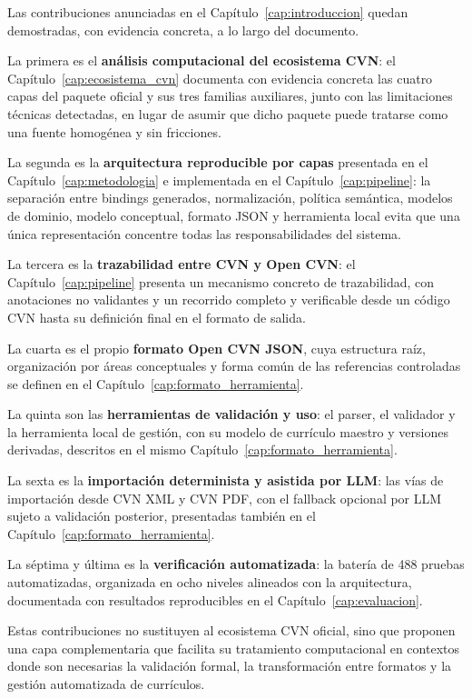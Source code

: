 Las contribuciones anunciadas en el Capítulo~\ref{cap:introduccion} quedan
demostradas, con evidencia concreta, a lo largo del documento.

La primera es el \textbf{análisis computacional del ecosistema CVN}: el
Capítulo~\ref{cap:ecosistema_cvn} documenta con evidencia concreta las
cuatro capas del paquete oficial y sus tres familias auxiliares, junto con
las limitaciones técnicas detectadas, en lugar de asumir que dicho paquete
puede tratarse como una fuente homogénea y sin fricciones.

La segunda es la \textbf{arquitectura reproducible por capas} presentada en
el Capítulo~\ref{cap:metodologia} e implementada en el
Capítulo~\ref{cap:pipeline}: la separación entre bindings generados,
normalización, política semántica, modelos de dominio, modelo conceptual,
formato JSON y herramienta local evita que una única representación
concentre todas las responsabilidades del sistema.

La tercera es la \textbf{trazabilidad entre CVN y Open CVN}: el
Capítulo~\ref{cap:pipeline} presenta un mecanismo concreto de trazabilidad,
con anotaciones no validantes y un recorrido completo y verificable desde
un código CVN hasta su definición final en el formato de salida.

La cuarta es el propio \textbf{formato Open CVN JSON}, cuya estructura raíz,
organización por áreas conceptuales y forma común de las referencias
controladas se definen en el Capítulo~\ref{cap:formato_herramienta}.

La quinta son las \textbf{herramientas de validación y uso}: el parser, el
validador y la herramienta local de gestión, con su modelo de currículo
maestro y versiones derivadas, descritos en el mismo
Capítulo~\ref{cap:formato_herramienta}.

La sexta es la \textbf{importación determinista y asistida por LLM}: las
vías de importación desde CVN XML y CVN PDF, con el fallback opcional por
LLM sujeto a validación posterior, presentadas también en el
Capítulo~\ref{cap:formato_herramienta}.

La séptima y última es la \textbf{verificación automatizada}: la batería
de 488 pruebas automatizadas, organizada en ocho niveles alineados con la
arquitectura, documentada con resultados reproducibles en el
Capítulo~\ref{cap:evaluacion}.

Estas contribuciones no sustituyen al ecosistema CVN oficial, sino que
proponen una capa complementaria que facilita su tratamiento computacional
en contextos donde son necesarias la validación formal, la transformación
entre formatos y la gestión automatizada de currículos.

